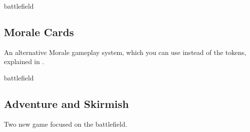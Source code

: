 \vspace*{1em}
\begin{multicols*}{2}
  \begin{expansion}{battlefield}
    \subsection*{Morale Cards}
    An alternative Morale gameplay system, which you can use instead of the tokens, explained in .
  \end{expansion}

  \columnbreak
  \begin{expansion}{battlefield}
    \subsection*{Adventure and Skirmish}
    Two new game  focused on the battlefield.
  \end{expansion}
\end{multicols*}

